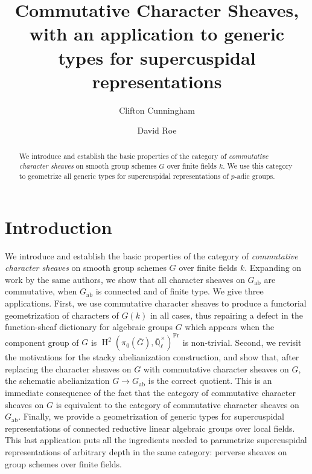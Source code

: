 \documentclass[10pt]{amsart}
\title[Commutative Character Sheaves]{Commutative Character Sheaves, with an application to generic types for supercuspidal representations}
\author{Clifton Cunningham}
\author{David Roe}
\theoremstyle{plain}
\theoremstyle{definition}
\newcommand{\EE}{\mathbb{\bar Q}_\ell}
\newcommand{\Fq}{k}
\newcommand{\EEx}{\EE^\times}
\newcommand{\Frob}[1]{\operatorname{Fr}_{#1}}
\DeclareMathOperator{\Hh}{H}
\newcommand{\ab}{_{\operatorname{ab}}}
\newcommand{\bG}{\bar{G}}
\begin{document}
\begin{abstract}
We introduce and establish the basic properties of  the category of \emph{commutative character sheaves} on smooth group schemes $G$ over finite fields $\Fq$. 
We use this category to geometrize all generic types for supercuspidal representations of $p$-adic groups. 
\end{abstract}

\maketitle

\section*{Introduction}
We introduce and establish the basic properties of  the category of \emph{commutative character sheaves} on smooth group schemes $G$ over finite fields $\Fq$. 
Expanding on work by the same authors, we show that all character sheaves on $G\ab$ are commutative, when $G\ab$ is connected and of finite type.
We give three applications.
First, we use commutative character sheaves to produce a functorial geometrization of characters of $G(\Fq)$ in all cases, thus repairing a defect in the function-sheaf dictionary for algebraic groups $G$ which appears when the component group of $G$ is $\Hh^2(\pi_0(\bG),\EEx)^{\Frob{}}$ is non-trivial. 
Second, we revisit the motivations for the stacky abelianization construction, and show that, after replacing the character sheaves on $G$ with commutative character sheaves on $G$, the schematic abelianization $G \to G\ab$ is the correct quotient.
This is an immediate consequence of the fact that the category of commutative character sheaves on $G$ is equivalent to the category of commutative character sheaves on $G\ab$. 
Finally, we provide a geometrization of generic types for supercuspidal representations of connected reductive linear algebraic groups over local fields.
This last application puts all the ingredients needed to parametrize supercuspidal representations of arbitrary depth in the same category: perverse sheaves on group schemes over finite fields.
\end{document}
